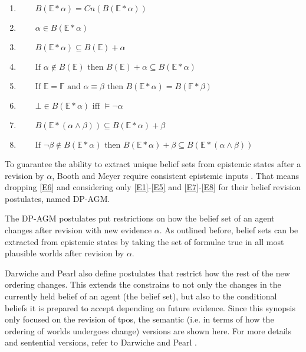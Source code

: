 \documentclass[english, 12pt]{scrartcl}
\theoremstyle{definition}
\theoremstyle{definition}
\theoremstyle{definition}
\begin{document}
\begin{enumerate}[wide=0pt, widest=99,leftmargin=\parindent,label = ($\mathbb{E}\!*\!\arabic*$)]
    \item\label{E1} $\qquad B(\mathbb{E}\ast\alpha) = Cn(B(\mathbb{E}\ast\alpha))$
    \item\label{E2} $\qquad \alpha \in B(\mathbb{E}\ast\alpha)$
    \item\label{E3} $\qquad B(\mathbb{E}\ast\alpha)  \subseteq B(\mathbb{E})+\alpha$
    \item\label{E4} $\qquad \textrm{If } \alpha \notin B(\mathbb{E}) \textrm{ then } B(\mathbb{E}) + \alpha \subseteq B(\mathbb{E} \ast \alpha)$
    \item\label{E5} $\qquad \textrm{If } \mathbb{E} = \mathbb{F} \textrm{ and } \alpha \equiv \beta \textrm{ then } B(\mathbb{E} \ast \alpha) = B(\mathbb{F} \ast \beta)$
    \item\label{E6} $\qquad \bot \in B(\mathbb{E} \ast \alpha) \textrm{ iff } \models \neg \alpha$
    \item\label{E7} $\qquad B(\mathbb{E} \ast (\alpha \wedge \beta)) \subseteq B(\mathbb{E} \ast \alpha) + \beta$
    \item\label{E8} $\qquad \textrm{If } \neg \beta \notin B(\mathbb{E} \ast \alpha) \textrm{ then } B(\mathbb{E} \ast \alpha) + \beta \subseteq B(\mathbb{E} \ast (\alpha \wedge \beta))$
\end{enumerate}

To guarantee the ability to extract unique belief sets from epistemic states after a revision by $\alpha$, Booth and Meyer require consistent epistemic inputs \cite{Booth2011}. That means dropping \ref{E6} and considering only \ref{E1}-\ref{E5} and \ref{E7}-\ref{E8} for their belief revision postulates, named DP-AGM.

The DP-AGM postulates put restrictions on how the belief set of an agent changes after revision with new evidence $\alpha$. As outlined before, belief sets can be extracted from epistemic states by taking the set of formulae true in all most plausible worlds after revision by $\alpha$.

Darwiche and Pearl also define postulates that restrict how the rest of the new ordering changes. This extends the constrains to not only the changes in the currently held belief of an agent (the belief set), but also to the conditional beliefs it is prepared to accept depending on future evidence. Since this synopsis only focused on the revision of tpos, the semantic (i.e. in terms of how the ordering of worlds undergoes change) versions are shown here. For more details and sentential versions, refer to Darwiche and Pearl \cite{Darwiche1997}.
\end{document}
